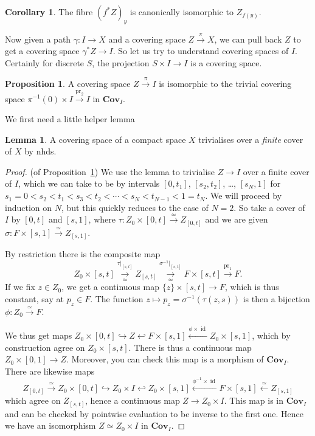 \documentclass{tufte-handout}
\def\Cov {\mathbf{Cov}}
\DeclareMathOperator{\id}{id}
\DeclareMathOperator{\pr}{pr}
\theoremstyle{definition}
\newtheorem{prop}{Proposition}
\newtheorem{lemma}{Lemma}
\newtheorem{corollary}{Corollary}
\begin{document}
\begin{corollary}
The fibre $(f^*Z)_y$ is canonically isomorphic to $Z_{f(y)}$.
\end{corollary}

Now given a path $\gamma\colon I \to X$ and a covering space $Z\xrightarrow{\pi}X$, we can 
pull back $Z$ to get a covering space $\gamma^*Z \to I$.
So let us try to understand covering spaces of $I$. 
Certainly for discrete $S$, the projection $S\times I \to I$ is a covering space.


\begin{prop}\label{prop:covering_sp_of_interval_triv}
A covering space $Z\xrightarrow{\pi} I$ is isomorphic to the trivial covering space $\pi^{-1}(0) \times I \xrightarrow{\pr_2} I$ 
in $\Cov_I$.
\end{prop}

We first need a little helper lemma

\begin{lemma}
A covering space of a compact space $X$ trivialises over a \emph{finite} cover of $X$ by nhds.
\end{lemma}

\begin{proof}(of Proposition~\ref{prop:covering_sp_of_interval_triv})
We use the lemma to trivialise $Z\to I$ over a finite cover of $I$, 
which we can take to be by intervals $[0,t_1]$, $[s_2,t_2]$, \ldots, $[s_N,1]$ 
for $s_1=0<s_2<t_1<s_3<t_2<\cdots<s_N <t_{N-1} <1=t_N$.
We will proceed by induction on $N$, but this quickly reduces to the case of $N=2$.
So take a cover of $I$ by $[0,t]$ and $[s,1]$, where $\tau\colon Z_0 \times [0,t] \xrightarrow{\simeq}Z_{[0,t]}$ 
and we are given $\sigma\colon F\times [s,1]\xrightarrow{\simeq} Z_{[s,1]}$.

By restriction there is the composite map
\[
Z_0\times [s,t] \underset{\simeq}{\xrightarrow{\tau|_{[s,t]}}} Z_{[s,t]} 
\underset{\simeq}{\xrightarrow{\sigma^{-1}|_{[s,t]}}} F\times [s,t] \xrightarrow{\pr_1} F.
\]
If we fix $z\in Z_0$, we get a continuous map $\{z\}\times [s,t] \to F$, which is thus 
constant, say at $p_z\in F$. The function $z\mapsto p_z = \sigma^{-1}(\tau(z,s))$ is 
then a bijection $\phi\colon Z_0 \xrightarrow{\simeq} F$.

We thus get maps $Z_0\times [0,t] \hookrightarrow Z \hookleftarrow F\times [s,1] 
\xleftarrow{\phi\times \id} Z_0\times [s,1]$, which by construction agree on $Z_0\times 
[s,t]$. There is thus a continuous map $Z_0 \times [0,1] \to Z$. Moreover, you can check 
this map is a morphism of $\Cov_I$. There are likewise maps
\[
Z_{[0,t]}\xrightarrow{\simeq} Z_0\times [0,t] \hookrightarrow Z_0\times I 
\hookleftarrow Z_0\times [s,1] \xleftarrow{\phi^{-1}\times \id} F\times [s,1] 
\xleftarrow{\simeq} Z_{[s,1]}
\]
which agree on $Z_{[s,t]}$, hence a continuous map $Z\to Z_0\times I$. 
This map is in $\Cov_I$ and can be checked by pointwise evaluation to be inverse to the 
first one.
Hence we have an isomorphism $Z\simeq Z_0\times I$ in $\Cov_I$.
\end{proof}
\end{document}
